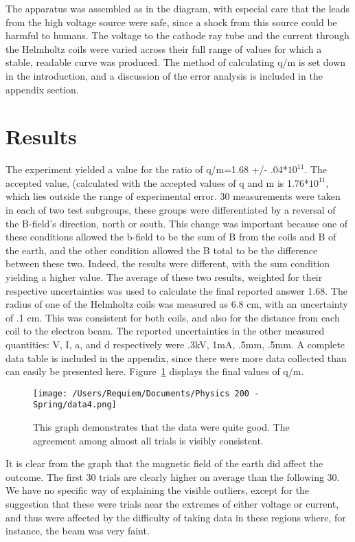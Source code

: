 \documentclass[aps,pre,twocolumn,nofootinbib]{revtex4}
\begin{document}
The apparatus was assembled as in the diagram, with especial care that the leads from the high voltage source were safe, since a shock from this source could be harmful to humans.  The voltage to the cathode ray tube and the current through the Helmholtz coils were varied across their full range of values for which a stable, readable curve was produced.  The method of calculating q/m is set down in the introduction, and a discussion of the error analysis is included in the appendix section.  

\section{Results}
The experiment yielded a value for the ratio of q/m=1.68 +/- .04*$10^{11}$.  The accepted value, (calculated with the accepted values of q and m is 1.76*$10^{11}$, which lies outside the range of experimental error.  30 measurements were taken in each of two test subgroups, these groups were differentiated by a reversal of the B-field's direction, north or south.  This change was important because one of these conditions allowed the b-field to be the sum of B from the coils and B of the earth, and the other condition allowed the B total to be the difference between these two.  Indeed, the results were different, with the sum condition yielding a higher value.  The average of these two results, weighted for their respective uncertainties was used to calculate the final reported answer 1.68.  The radius of one of the Helmholtz coils was  measured as 6.8 cm, with an uncertainty of .1 cm.  This was consistent for both coils, and also for the distance from each coil to the electron beam.  The reported uncertainties in the other measured quantities: V, I, a, and d respectively were .3kV, 1mA, .5mm, .5mm.   A complete data table is included in the appendix, since there were more data collected than can easily be presented here.  Figure~\ref{data4} displays the final values of q/m.  

\begin{figure}[h]
\centering
\texttt{[image: /Users/Requiem/Documents/Physics 200 - Spring/data4.png]} 
\caption{This graph demonstrates that the data were quite good.  The agreement among almost all trials is visibly consistent. }
\label{data4}
\end{figure}

It is clear from the graph that the magnetic field of the earth did affect the outcome.  The first 30 trials are clearly higher on average than the following 30.  We have no specific way of explaining the visible outliers, except for the suggestion that these were trials near the extremes of either voltage or current, and thus were affected by the difficulty of taking data in these regions where, for instance, the beam was very faint.  
\end{document}
